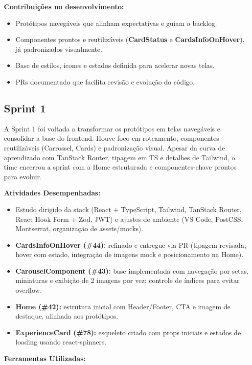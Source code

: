 \textbf{Contribuições no desenvolvimento:}

\begin{itemize}
\item
  Protótipos navegáveis que alinham expectativas e guiam o backlog.
\item
  Componentes prontos e reutilizáveis (\textbf{CardStatus} e
  \textbf{CardsInfoOnHover}), já padronizados visualmente.
\item
  Base de estilos, ícones e estados definida para acelerar novas telas.
\item
  PRs documentado que facilita revisão e evolução do código.
\end{itemize}

\subsection{Sprint 1}

A Sprint 1 foi voltada a transformar os protótipos em telas navegáveis e
consolidar a base do frontend. Houve foco em roteamento, componentes
reutilizáveis (Carrossel, Cards) e padronização visual. Apesar da curva
de aprendizado com TanStack Router, tipagem em TS e detalhes de
Tailwind, o time encerrou a sprint com a Home estruturada e
componentes-chave prontos para evoluir.

\textbf{Atividades Desempenhadas:}

\begin{itemize}
\item
  Estudo dirigido da stack (React + TypeScript, Tailwind, TanStack
  Router, React Hook Form + Zod, JWT) e ajustes de ambiente (VS Code,
  PostCSS, Montserrat, organização de assets/mocks).
\item
  \textbf{CardsInfoOnHover (\#44):} refinado e entregue via PR (tipagem
  revisada, hover com estado, integração de imagens mock e
  posicionamento na Home).
\item
  \textbf{CarouselComponent (\#43):} base implementada com navegação por
  setas, miniaturas e exibição de 2 imagens por vez; controle de índices
  para evitar overflow.
\item
  \textbf{Home (\#42):} estrutura inicial com Header/Footer, CTA e
  imagem de destaque, alinhada aos protótipos.
\item
  \textbf{ExperienceCard (\#78):} esqueleto criado com props iniciais e
  estados de loading usando react-spinners.
\end{itemize}

\textbf{Ferramentas Utilizadas:}


